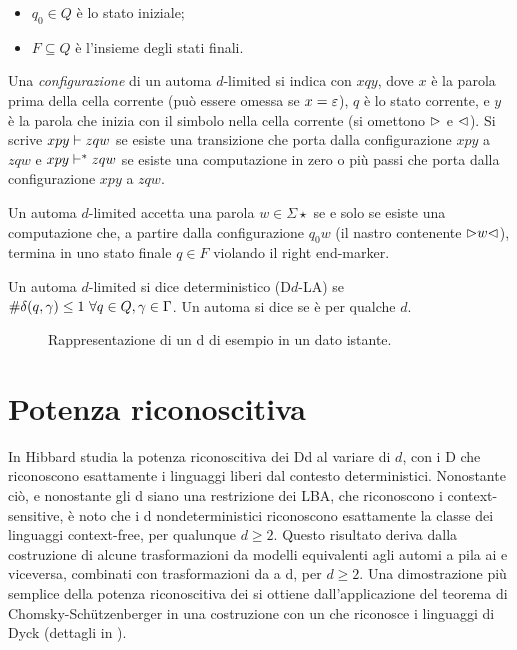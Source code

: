 \begin{defin}
\begin{itemize}
		\item $q_0\in Q$ è lo stato iniziale;
		\item $F\subseteq Q$ è l'insieme degli stati finali.
	\end{itemize}
	Una \emph{configurazione} di un automa $d$-limited si indica con $xqy$, dove $x$ è la parola prima della cella corrente (può essere omessa se $x=\varepsilon$), $q$ è lo stato corrente, e $y$ è la parola che inizia con il simbolo nella cella corrente (si omettono $\rhd$ e $\lhd$). Si scrive $xpy\vdash zqw$ se esiste una transizione che porta dalla configurazione $xpy$ a $zqw$ e $xpy\vdash^* zqw$ se esiste una computazione in zero o più passi che porta dalla configurazione $xpy$ a $zqw$.

	Un automa $d$-limited accetta una parola $w\in\Sigma\star$ se e solo se esiste una computazione che, a partire dalla configurazione $q_0w$ (il nastro contenente $\rhd w\lhd$), termina in uno stato finale $q\in F$ violando il right end-marker.

	Un automa $d$-limited si dice deterministico (D$d$-LA) se $\# \delta(q,\gamma)\leq 1 ~ \forall q\in Q,\gamma\in\Gamma$. Un automa si dice  se è  per qualche $d$.
\end{defin}

\begin{figure}
	\centering
	
	\caption{Rappresentazione di un \la d di esempio in un dato istante.}
\end{figure}



\section{Potenza riconoscitiva}
In \cite{Hibbard:67:CFdet} Hibbard studia la potenza riconoscitiva dei D\la d al variare di $d$, con i D che riconoscono esattamente i linguaggi liberi dal contesto deterministici. Nonostante ciò, e nonostante gli \la d siano una restrizione dei LBA, che riconoscono i context-sensitive, è noto che i \la d nondeterministici riconoscono esattamente la classe dei linguaggi context-free, per qualunque $d\geq2$. Questo risultato deriva dalla costruzione di alcune trasformazioni da modelli equivalenti agli automi a pila ai  e viceversa, combinati con trasformazioni da  a \la d, per $d\geq2$. Una dimostrazione più semplice della potenza riconoscitiva dei  si ottiene dall'applicazione del teorema di Chomsky-Schützenberger \cite{Chomsky:63:algebraCF} in una costruzione con un  che riconosce i linguaggi di Dyck (dettagli in \cite{Pighizzini:19:limited}).

